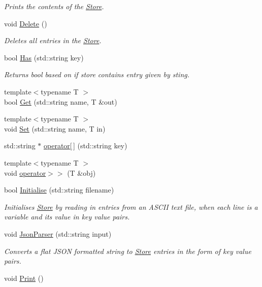 \begin{DoxyCompactItemize}
\begin{DoxyCompactList}\small\item\em Prints the contents of the \hyperlink{classStore}{Store}. \end{DoxyCompactList}\item 
\hypertarget{classStore_a7fce0f8f3ec7978c5e7cd3d7053f899b}{void \hyperlink{classStore_a7fce0f8f3ec7978c5e7cd3d7053f899b}{Delete} ()}\label{classStore_a7fce0f8f3ec7978c5e7cd3d7053f899b}

\begin{DoxyCompactList}\small\item\em Deletes all entries in the \hyperlink{classStore}{Store}. \end{DoxyCompactList}\item 
bool \hyperlink{classStore_a41eaa81c4612fb5bdbf850afb6428977}{Has} (std\-::string key)
\begin{DoxyCompactList}\small\item\em Returns bool based on if store contains entry given by sting. \end{DoxyCompactList}\item 
{\footnotesize template$<$typename T $>$ }\\bool \hyperlink{classStore_abdc0134daa34b808328070f5d6b295f3}{Get} (std\-::string name, T \&out)
\item 
{\footnotesize template$<$typename T $>$ }\\void \hyperlink{classStore_af586739813ce18da6f5e3561d134a814}{Set} (std\-::string name, T in)
\item 
std\-::string $\ast$ \hyperlink{classStore_a790ca02bc7d11648edf0c8d5df3751fe}{operator\mbox{[}$\,$\mbox{]}} (std\-::string key)
\item 
{\footnotesize template$<$typename T $>$ }\\void \hyperlink{classStore_abe9b65d1308c43dc4158b00d6aed7385}{operator$>$$>$} (T \&obj)
\item 
bool \hyperlink{classStore_a5247080901fb214804d0191681a30a83}{Initialise} (std\-::string filename)
\begin{DoxyCompactList}\small\item\em Initialises \hyperlink{classStore}{Store} by reading in entries from an A\-S\-C\-I\-I text file, when each line is a variable and its value in key value pairs. \end{DoxyCompactList}\item 
void \hyperlink{classStore_adb84e3fb286cae07f64e8186b7ab04e1}{Json\-Parser} (std\-::string input)
\begin{DoxyCompactList}\small\item\em Converts a flat J\-S\-O\-N formatted string to \hyperlink{classStore}{Store} entries in the form of key value pairs. \end{DoxyCompactList}\item 
\hypertarget{classStore_a9d2f000bd849a9f5de71c3ba62dca340}{void \hyperlink{classStore_a9d2f000bd849a9f5de71c3ba62dca340}{Print} ()}\label{classStore_a9d2f000bd849a9f5de71c3ba62dca340}


\end{DoxyCompactItemize}
